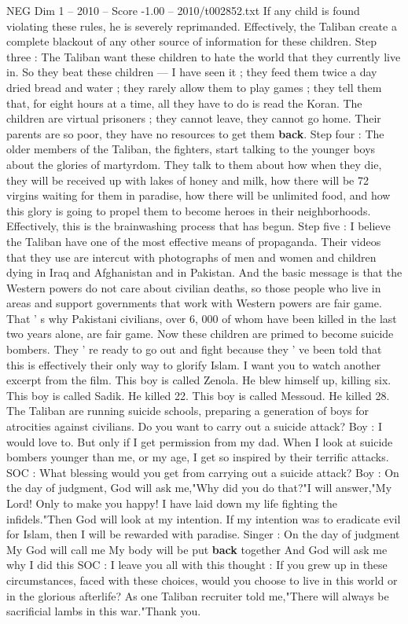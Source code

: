 \begin{textsample}{NEG Dim 1 – 2010 – Score -1.00 – 2010/t002852.txt}
If any child is found violating these rules, he is severely reprimanded.
Effectively, the Taliban create a complete blackout of any other source of information for these children.
Step three : The Taliban want these children to hate the world that they currently live in.
So they beat these children — I have seen it ; they feed them twice a day dried bread and water ; they rarely allow them to play games ; they tell them that, for eight hours at a time, all they have to do is read the Koran.
The children are virtual prisoners ; they cannot leave, they cannot go home.
Their parents are so poor, they have no resources to get them \textbf{back}.
Step four : The older members of the Taliban, the fighters, start talking to the younger boys about the glories of martyrdom.
They talk to them about how when they die, they will be received up with lakes of honey and milk, how there will be 72 virgins waiting for them in paradise, how there will be unlimited food, and how this glory is going to propel them to become heroes in their neighborhoods.
Effectively, this is the brainwashing process that has begun.
Step five : I believe the Taliban have one of the most effective means of propaganda.
Their videos that they use are intercut with photographs of men and women and children dying in Iraq and Afghanistan and in Pakistan.
And the basic message is that the Western powers do not care about civilian deaths, so those people who live in areas and support governments that work with Western powers are fair game.
That ' s why Pakistani civilians, over 6, 000 of whom have been killed in the last two years alone, are fair game.
Now these children are primed to become suicide bombers.
They ' re ready to go out and fight because they ' ve been told that this is effectively their only way to glorify Islam.
I want you to watch another excerpt from the film.
This boy is called Zenola.
He blew himself up, killing six.
This boy is called Sadik.
He killed 22.
This boy is called Messoud.
He killed 28.
The Taliban are running suicide schools, preparing a generation of boys for atrocities against civilians.
Do you want to carry out a suicide attack?
Boy : I would love to.
But only if I get permission from my dad.
When I look at suicide bombers younger than me, or my age, I get so inspired by their terrific attacks.
SOC : What blessing would you get from carrying out a suicide attack?
Boy : On the day of judgment, God will ask me,"Why did you do that?"I will answer,"My Lord!
Only to make you happy!
I have laid down my life fighting the infidels."Then God will look at my intention.
If my intention was to eradicate evil for Islam, then I will be rewarded with paradise.
Singer : On the day of judgment My God will call me My body will be put \textbf{back} together And God will ask me why I did this SOC : I leave you all with this thought : If you grew up in these circumstances, faced with these choices, would you choose to live in this world or in the glorious afterlife?
As one Taliban recruiter told me,"There will always be sacrificial lambs in this war."Thank you.

\end{textsample}
